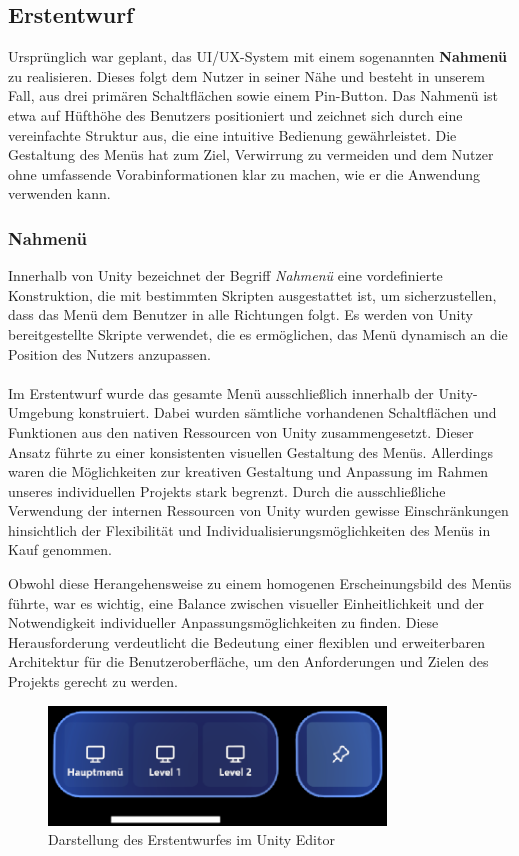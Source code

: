 \subsection{Erstentwurf}
Ursprünglich war geplant, das UI/UX-System mit einem sogenannten \textbf{Nahmenü} zu realisieren. Dieses folgt dem Nutzer in seiner Nähe und besteht in unserem Fall, aus drei primären Schaltflächen sowie einem Pin-Button. Das Nahmenü ist etwa auf Hüfthöhe des Benutzers positioniert und zeichnet sich durch eine vereinfachte Struktur aus, die eine intuitive Bedienung gewährleistet. Die Gestaltung des Menüs hat zum Ziel, Verwirrung zu vermeiden und dem Nutzer ohne umfassende Vorabinformationen klar zu machen, wie er die Anwendung verwenden kann.

\subsubsection*{Nahmenü}
Innerhalb von Unity bezeichnet der Begriff \textit{Nahmenü} eine vordefinierte Konstruktion, die mit bestimmten Skripten ausgestattet ist, um sicherzustellen, dass das Menü dem Benutzer in alle Richtungen folgt. Es werden von Unity bereitgestellte Skripte verwendet, die es ermöglichen, das Menü dynamisch an die Position des Nutzers anzupassen.\\
\\
Im Erstentwurf wurde das gesamte Menü ausschließlich innerhalb der Unity-Umgebung konstruiert. Dabei wurden sämtliche vorhandenen Schaltflächen und Funktionen aus den nativen Ressourcen von Unity zusammengesetzt. Dieser Ansatz führte zu einer konsistenten visuellen Gestaltung des Menüs. Allerdings waren die Möglichkeiten zur kreativen Gestaltung und Anpassung im Rahmen unseres individuellen Projekts stark begrenzt. Durch die ausschließliche Verwendung der internen Ressourcen von Unity wurden gewisse Einschränkungen hinsichtlich der Flexibilität und Individualisierungsmöglichkeiten des Menüs in Kauf genommen.

Obwohl diese Herangehensweise zu einem homogenen Erscheinungsbild des Menüs führte, war es wichtig, eine Balance zwischen visueller Einheitlichkeit und der Notwendigkeit individueller Anpassungsmöglichkeiten zu finden. Diese Herausforderung verdeutlicht die Bedeutung einer flexiblen und erweiterbaren Architektur für die Benutzeroberfläche, um den Anforderungen und Zielen des Projekts gerecht zu werden.
\begin{figure}[H]
    \centering
    \includegraphics[width=0.8\textwidth]{images/menubarversion1.png}
    \caption{Darstellung des Erstentwurfes im Unity Editor}
    \label{fig:menübar}
\end{figure}

